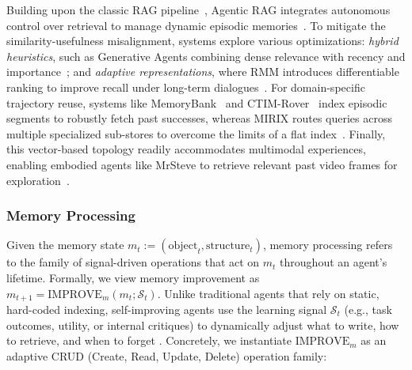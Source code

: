 \documentclass{article}
\begin{document}
\begin{itemize}[leftmargin=*]
    Building upon the classic RAG pipeline~\citep{lewis2021retrievalaugmentedgenerationknowledgeintensivenlp}, Agentic RAG integrates autonomous control over retrieval to manage dynamic episodic memories~\citep{ravuru2024agenticretrievalaugmentedgenerationtime, singh2025agenticretrievalaugmentedgenerationsurvey}. To mitigate the similarity-usefulness misalignment, systems explore various optimizations: \textit{hybrid heuristics}, such as Generative Agents combining dense relevance with recency and importance~\citep{park2023generativeagentsinteractivesimulacra}; and \textit{adaptive representations}, where RMM introduces differentiable ranking to improve recall under long-term dialogues~\citep{tan2025prospectretrospectreflectivememory}. For domain-specific trajectory reuse, systems like MemoryBank~\citep{zhong2024memorybank} and CTIM-Rover~\citep{lindenbauer2025knowledgenoisectimroverpitfalls} index episodic segments to robustly fetch past successes, whereas MIRIX routes queries across multiple specialized sub-stores to overcome the limits of a flat index~\citep{wang2025mirixmultiagentmemoryllmbased}. Finally, this vector-based topology readily accommodates multimodal experiences, enabling embodied agents like MrSteve to retrieve relevant past video frames for exploration~\citep{park2025mrsteveinstructionfollowingagentsminecraft}.

\end{itemize}

\subsubsection{Memory Processing}
\label{sec:Memory_Processing}
Given the memory state $m_t := (\text{object}_t,\text{structure}_t)$, memory processing refers to the family of signal-driven operations that act on $m_t$ throughout an agent's lifetime.  Formally, we view memory improvement as $m_{t+1} = \text{IMPROVE}_m(m_t; \mathcal{S}_t)$. Unlike traditional agents that rely on static, hard-coded indexing, self-improving agents use the learning signal $\mathcal{S}_t$ (e.g., task outcomes, utility, or internal critiques) to dynamically adjust what to write, how to retrieve, and when to forget \citep{xu2025sedmscalableselfevolvingdistributed, liang2025selfevolvingagentsreflectivememoryaugmented}. Concretely, we instantiate $\text{IMPROVE}_m$ as an adaptive CRUD (Create, Read, Update, Delete) operation family: 
\end{document}
